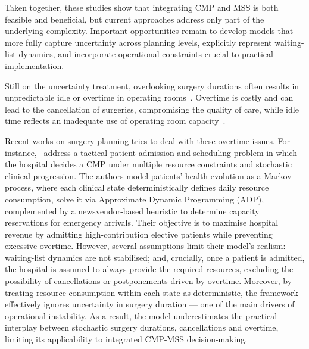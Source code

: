 \documentclass[review,3p,authoryear]{elsarticle}
\begin{document}
Taken together, these studies show that integrating CMP and MSS is both feasible and beneficial, but current approaches address only part of the underlying complexity. 
Important opportunities remain to develop models that more fully capture uncertainty across planning levels, explicitly represent waiting-list dynamics, and incorporate operational constraints crucial to practical implementation.

Still on the uncertainty treatment, overlooking surgery durations often results in unpredictable idle or overtime in operating rooms~\citep{shehadeh2022stochastic}. 
Overtime is costly and can lead to the cancellation of surgeries, compromising the quality of care, while idle time reflects an inadequate use of operating room capacity~\citep{shehadeh2022stochastic, Harris2022, Kayvanfar2025}.

Recent works on surgery planning tries to deal with these overtime issues.
For instance,~\citet{Barz2015} address a tactical patient admission and scheduling problem in which the hospital decides a CMP under multiple resource constraints and stochastic clinical progression. 
The authors model patients' health evolution as a Markov process, where each clinical state deterministically defines daily resource consumption, solve it via Approximate Dynamic Programming (ADP), complemented by a newsvendor-based heuristic to determine capacity reservations for emergency arrivals. 
Their objective is to maximise hospital revenue by admitting high-contribution elective patients while preventing excessive overtime.
However, several assumptions limit their model's realism: waiting-list dynamics are not stabilised; and, crucially, once a patient is admitted, the hospital is assumed to always provide the required resources, excluding the possibility of cancellations or postponements driven by overtime. 
Moreover, by treating resource consumption within each state as deterministic, the framework effectively ignores uncertainty in surgery duration --- one of the main drivers of operational instability. 
As a result, the model underestimates the practical interplay between stochastic surgery durations, cancellations and overtime, limiting its applicability to integrated CMP-MSS decision-making.
\end{document}
